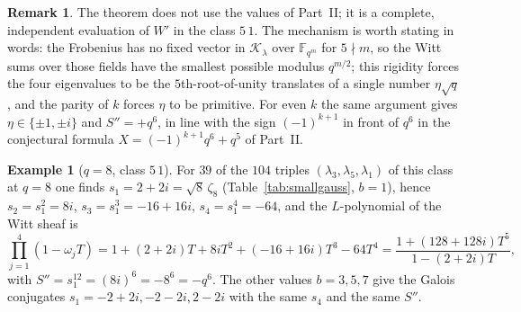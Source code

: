 \documentclass[12pt,a4paper]{amsart}
\theoremstyle{definition}
\newtheorem{remark}[theorem]{Remark}
\newtheorem{example}[theorem]{Example}
\newcommand{\F}{\mathbb{F}}
\newcommand{\Kk}{\mathcal{K}}
\newcommand{\Spp}{S''}
\begin{document}
\begin{remark}
The theorem does not use the values of Part~II; it is a complete, independent evaluation of $W'$ in the class $5\,1$. The mechanism is worth stating in words: the Frobenius has no fixed vector in $\Kk_\lambda$ over $\F_{q^m}$ for $5\nmid m$, so the Witt sums over those fields have the smallest possible modulus $q^{m/2}$; this rigidity forces the four eigenvalues to be the $5$th-root-of-unity translates of a single number $\eta\sqrt q$, and the parity of $k$ forces $\eta$ to be primitive. For even $k$ the same argument gives $\eta\in\{\pm1,\pm i\}$ and $\Spp=+q^6$, in line with the sign $(-1)^{k+1}$ in front of $q^6$ in the conjectural formula $X=(-1)^{k+1}q^6+q^5$ of Part~II.
\end{remark}

\begin{example}[$q=8$, class $5\,1$]
For $39$ of the $104$ triples $(\lambda_3,\lambda_5,\lambda_1)$ of this class at $q=8$ one finds $s_1=2+2i=\sqrt8\,\zeta_8$ (Table~\ref{tab:smallgauss}, $b=1$), hence $s_2=s_1^2=8i$, $s_3=s_1^3=-16+16i$, $s_4=s_1^4=-64$, and the $L$-polynomial of the Witt sheaf is
\[
\prod_{j=1}^4(1-\omega_jT)=1+(2+2i)T+8iT^2+(-16+16i)T^3-64T^4=\frac{1+(128+128i)T^5}{1-(2+2i)T},
\]
with $\Spp=s_1^{12}=(8i)^6=-8^6=-q^6$. The other values $b=3,5,7$ give the Galois conjugates $s_1=-2+2i,-2-2i,2-2i$ with the same $s_4$ and the same $\Spp$.
\end{example}
\end{document}
